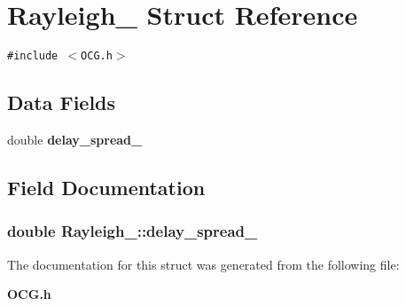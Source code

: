 \section{Rayleigh\_\- Struct Reference}
\label{structRayleigh__}
{\tt \#include $<$OCG.h$>$}

\subsection*{Data Fields}
\begin{CompactItemize}
\item 
double {\bf delay\_\-spread\_\-}
\end{CompactItemize}


\subsection{Field Documentation}
\subsubsection[{delay\_\-spread\_\-}]{\setlength{\rightskip}{0pt plus 5cm}double {\bf Rayleigh\_\-::delay\_\-spread\_\-}}\label{structRayleigh___b527d7b164ebdb218aa91348597e9a9b}




The documentation for this struct was generated from the following file:\begin{CompactItemize}
\item 
{\bf OCG.h}\end{CompactItemize}
